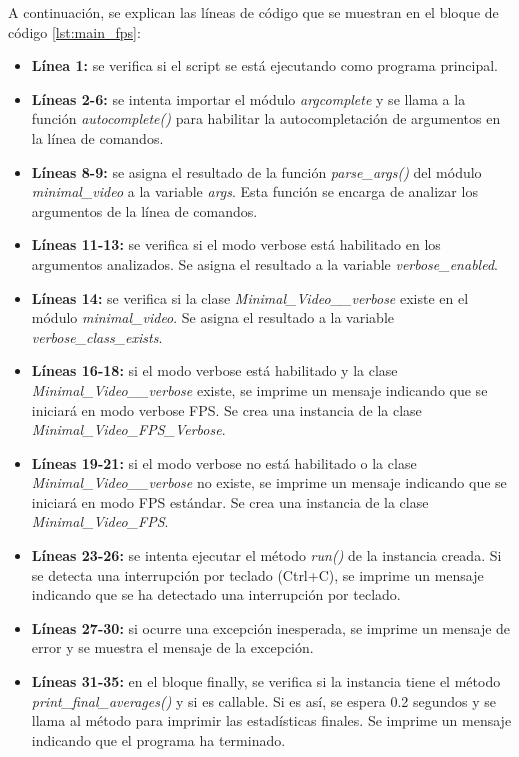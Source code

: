 A continuación, se explican las líneas de código que se muestran en el bloque de código \ref{lst:main_fps}:
\begin{itemize}
    \item \textbf{Línea 1:} se verifica si el script se está ejecutando como programa principal.
    \item \textbf{Líneas 2-6:} se intenta importar el módulo \textit{argcomplete} y se llama a la función \textit{autocomplete()} para habilitar la autocompletación de argumentos en la línea de comandos.
    \item \textbf{Líneas 8-9:} se asigna el resultado de la función \textit{parse\_args()} del módulo \textit{minimal\_video} a la variable \textit{args}. Esta función se encarga de analizar los argumentos de la línea de comandos.
    \item \textbf{Líneas 11-13:} se verifica si el modo verbose está habilitado en los argumentos analizados. Se asigna el resultado a la variable \textit{verbose\_enabled}.
    \item \textbf{Líneas 14:} se verifica si la clase \textit{Minimal\_Video\_\_verbose} existe en el módulo \textit{minimal\_video}. Se asigna el resultado a la variable \textit{verbose\_class\_exists}.
    \item \textbf{Líneas 16-18:} si el modo verbose está habilitado y la clase \textit{Minimal\_Video\_\_verbose} existe, se imprime un mensaje indicando que se iniciará en modo verbose FPS. Se crea una instancia de la clase \textit{Minimal\_Video\_FPS\_Verbose}.
    \item \textbf{Líneas 19-21:} si el modo verbose no está habilitado o la clase \textit{Minimal\_Video\_\_verbose} no existe, se imprime un mensaje indicando que se iniciará en modo FPS estándar. Se crea una instancia de la clase \textit{Minimal\_Video\_FPS}.
    \item \textbf{Líneas 23-26:} se intenta ejecutar el método \textit{run()} de la instancia creada. Si se detecta una interrupción por teclado (Ctrl+C), se imprime un mensaje indicando que se ha detectado una interrupción por teclado.
    \item \textbf{Líneas 27-30:} si ocurre una excepción inesperada, se imprime un mensaje de error y se muestra el mensaje de la excepción.
    \item \textbf{Líneas 31-35:} en el bloque finally, se verifica si la instancia tiene el método \textit{print\_final\_averages()} y si es callable. Si es así, se espera 0.2 segundos y se llama al método para imprimir las estadísticas finales. Se imprime un mensaje indicando que el programa ha terminado.
\end{itemize}
\vspace{\baselineskip}

